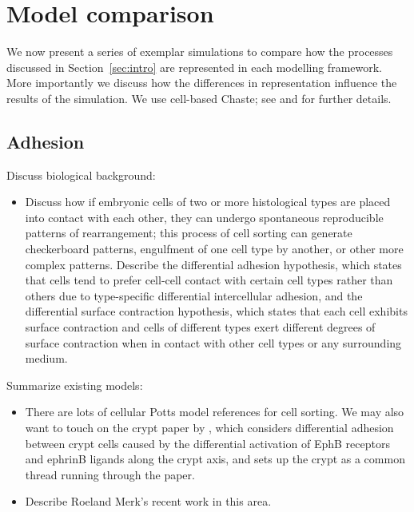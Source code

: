 \documentclass{article}
\begin{document}
\section{Model comparison}\label{sec:model_comparison}
We now present a series of exemplar simulations to compare how the processes discussed in Section~\ref{sec:intro} are represented in each modelling framework.
More importantly we discuss how the differences in representation influence the results of the simulation. 
We use cell-based Chaste; see \citet{Mirams2013Chaste} and \citet{Pitt-Francis2012Chaste} for further details.

\subsection{Adhesion} \label{sec:adhesion}

Discuss biological background:
\begin{itemize}
\item Discuss how if embryonic cells of two or more histological types are placed into contact with each other, they can undergo spontaneous reproducible patterns of rearrangement; this process of cell sorting can generate checkerboard patterns, engulfment of one cell type by another, or other more complex patterns. Describe the differential adhesion hypothesis, which states that cells tend to prefer cell-cell contact with certain cell types rather than others due to type-specific differential intercellular adhesion, and the differential surface contraction hypothesis, which states that each cell exhibits surface contraction and cells of different types exert different degrees of surface contraction when in contact with other cell types or any surrounding medium.
\end{itemize}

\noindent Summarize existing models:
\begin{itemize}
\item There are lots of cellular Potts model references for cell sorting. We may also want to touch on the crypt paper by \citet{Wong2010Computational}, which considers differential adhesion between crypt cells caused by the differential activation of EphB receptors and ephrinB ligands along the crypt axis, and sets up the crypt as a common thread running through the paper.
\item Describe Roeland Merk's recent work in this area.
\end{itemize}
\end{document}
